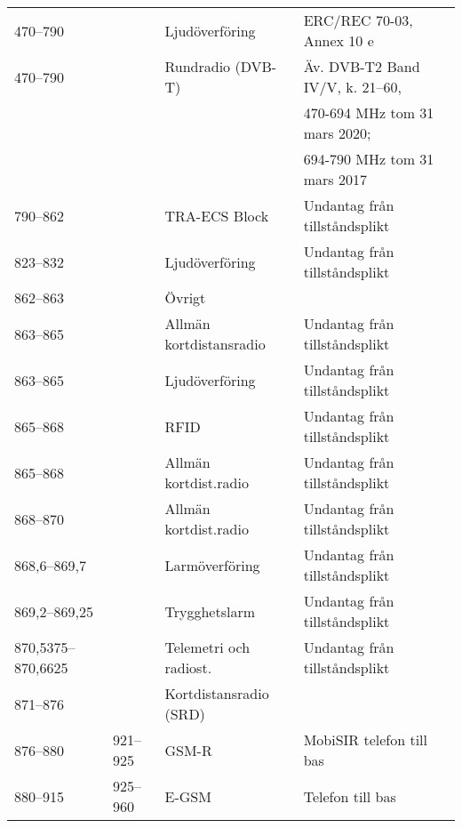 \begin{landscape}
\begin{longtable}{llll}
	470--790           &                    & Ljudöverföring          & ERC/REC 70-03, Annex 10 e             \\
	470--790           &                    & Rundradio (DVB-T)       & Äv. DVB-T2 Band IV/V, k. 21--60,      \\
	                   &                    &                         & 470-694 MHz tom 31 mars 2020;         \\
	                   &                    &                         & 694-790 MHz tom 31 mars 2017          \\
	790--862           &                    & TRA-ECS	Block     & Undantag från tillståndsplikt         \\
	823--832           &                    & Ljudöverföring          & Undantag från tillståndsplikt         \\
	862--863           &                    & Övrigt                  &                                       \\
	863--865           &                    & Allmän kortdistansradio & Undantag från tillståndsplikt         \\
	863--865           &                    & Ljudöverföring          & Undantag från tillståndsplikt         \\
	865--868           &                    & RFID                    & Undantag från tillståndsplikt         \\
	865--868           &                    & Allmän kortdist.radio   & Undantag från tillståndsplikt         \\
	868--870           &                    & Allmän kortdist.radio   & Undantag från tillståndsplikt         \\
	868,6--869,7       &                    & Larmöverföring          & Undantag från tillståndsplikt         \\
	869,2--869,25      &                    & Trygghetslarm           & Undantag från tillståndsplikt         \\
	870,5375--870,6625 &                    & Telemetri och radiost.  & Undantag från tillståndsplikt         \\
	871--876           &                    & Kortdistansradio (SRD)  &                                       \\
	876--880           & 921--925           & GSM-R                   & MobiSIR telefon till bas              \\
	880--915           & 925--960           & E-GSM                   & Telefon till bas                      \\

\end{longtable}
\end{landscape}
